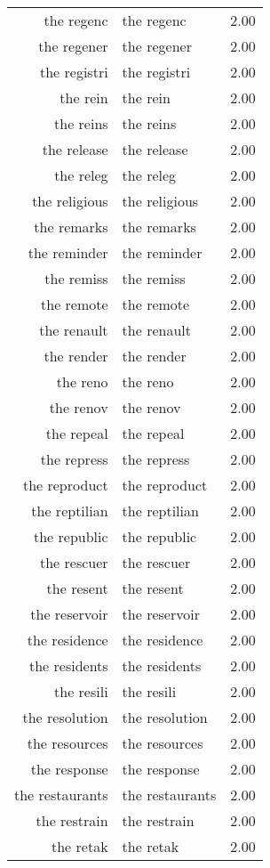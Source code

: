 \begin{table}[ht]
\begin{tabular}{rlr}
  the regenc & the regenc & 2.00 \\ 
  the regener & the regener & 2.00 \\ 
  the registri & the registri & 2.00 \\ 
  the rein & the rein & 2.00 \\ 
  the reins & the reins & 2.00 \\ 
  the release & the release & 2.00 \\ 
  the releg & the releg & 2.00 \\ 
  the religious & the religious & 2.00 \\ 
  the remarks & the remarks & 2.00 \\ 
  the reminder & the reminder & 2.00 \\ 
  the remiss & the remiss & 2.00 \\ 
  the remote & the remote & 2.00 \\ 
  the renault & the renault & 2.00 \\ 
  the render & the render & 2.00 \\ 
  the reno & the reno & 2.00 \\ 
  the renov & the renov & 2.00 \\ 
  the repeal & the repeal & 2.00 \\ 
  the repress & the repress & 2.00 \\ 
  the reproduct & the reproduct & 2.00 \\ 
  the reptilian & the reptilian & 2.00 \\ 
  the republic & the republic & 2.00 \\ 
  the rescuer & the rescuer & 2.00 \\ 
  the resent & the resent & 2.00 \\ 
  the reservoir & the reservoir & 2.00 \\ 
  the residence & the residence & 2.00 \\ 
  the residents & the residents & 2.00 \\ 
  the resili & the resili & 2.00 \\ 
  the resolution & the resolution & 2.00 \\ 
  the resources & the resources & 2.00 \\ 
  the response & the response & 2.00 \\ 
  the restaurants & the restaurants & 2.00 \\ 
  the restrain & the restrain & 2.00 \\ 
  the retak & the retak & 2.00 \\ 

\end{tabular}
\end{table}
